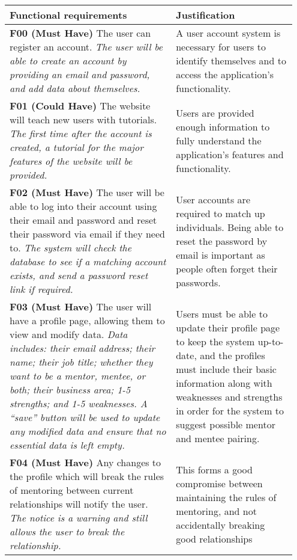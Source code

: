 \documentclass[10pt]{article}
\begin{document}
\begin{longtable}{|p{0.55\linewidth}|p{0.4\linewidth}|}
    \hline
    \textbf{Functional requirements}
        &
    \textbf{Justification}
    \\ \hline\hline

    \textbf{F00 (Must Have) }
    The user can register an account.
    \textit{The user will be able to create an account by providing an email and
    password, and add data about themselves.}
        &
    A user account system is necessary for users to identify themselves and to
    access the application's functionality.
    \\ \hline

    \textbf{F01 (Could Have) }
    The website will teach new users with tutorials.
    \textit{The first time after the account is created, a tutorial for the
    major features of the website will be provided.}
        &
    Users are provided enough information to fully understand the application's
    features and functionality.
    \\ \hline

    \textbf{F02 (Must Have) }
    The user will be able to log into their account using their email and
    password and reset their password via email if they need to.
    \textit{The system will check the database to see if a matching account
    exists, and send a password reset link if required.}
        &
    User accounts are required to match up individuals. Being able to reset the
    password by email is important as people often forget their passwords.
    \\ \hline

    \textbf{F03 (Must Have) }
    The user will have a profile page, allowing them to view and modify data.
    \textit{Data includes: their email address; their name; their job title;
    whether they want to be a mentor, mentee, or both; their business area; 1-5
    strengths; and 1-5 weaknesses. A “save” button will be used to update any
    modified data and ensure that no essential data is left empty.}
        &
    Users must be able to update their profile page to keep the system
    up-to-date, and the profiles must include their basic information along with
    weaknesses and strengths in order for the system to suggest possible mentor
    and mentee pairing.
    \\ \hline

    \textbf{F04 (Must Have) }
    Any changes to the profile which will break the rules of mentoring between
    current relationships will notify the user.
    \textit{The notice is a warning and still allows the user to break the
    relationship.}
        &
    This forms a good compromise between maintaining the rules of mentoring,
    and not accidentally breaking good relationships
    \\ \hline


\end{longtable}
\end{document}
